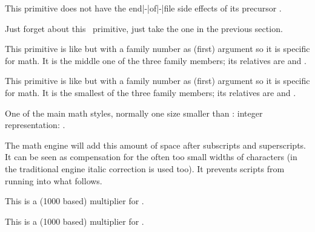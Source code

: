 \typebuffer

This primitive does not have the end|-|of|-|file side effects of its precursor
.

{\getbuffer}

\stopnewprimitive

\startoldprimitive[title={\prm {scantokens}}]

Just forget about this \ETEX\ primitive, just take the one in the previous section.

\stopoldprimitive

\startoldprimitive[title={\prm {scriptfont}}]

This primitive is like  but with a family number as (first) argument
so it is specific for math. It is the middle one of the three family members; its
relatives are  and .

\stopoldprimitive

\startoldprimitive[title={\prm {scriptscriptfont}}]

This primitive is like  but with a family number as (first) argument
so it is specific for math. It is the smallest of the three family members; its
relatives are  and .

\stopoldprimitive

\startoldprimitive[title={\prm {scriptscriptstyle}}]

One of the main math styles, normally one size smaller than :
integer representation: \the\scriptscriptstyle.

\stopoldprimitive

\startoldprimitive[title={\prm {scriptspace}}][obsolete=yes]

The math engine will add this amount of space after subscripts and superscripts.
It can be seen as compensation for the often too small widths of characters (in
the traditional engine italic correction is used too). It prevents scripts from
running into what follows.

\stopoldprimitive

\startnewprimitive[title={\prm {scriptspaceafterfactor}}]

This is a (1000 based) multiplier for .

\stopnewprimitive

\startnewprimitive[title={\prm {scriptspacebeforefactor}}]

This is a (1000 based) multiplier for .

